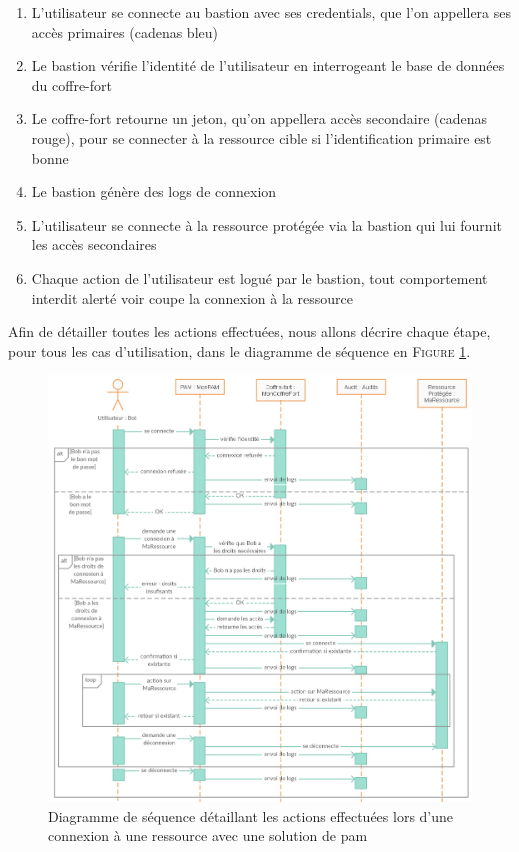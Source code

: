 \begin{enumerate}
	\item L'utilisateur se connecte au \gls{bastion} avec ses \glspl{credential}, que l'on appellera ses accès primaires (cadenas bleu)
	\item Le \gls{bastion} vérifie l'identité de l'utilisateur en interrogeant le base de données du coffre-fort
	\item Le coffre-fort retourne un jeton, qu'on appellera accès secondaire (cadenas rouge), pour se connecter à la ressource cible si l'identification primaire est bonne
	\item Le \gls{bastion} génère des logs de connexion
	\item L'utilisateur se connecte à la ressource protégée via la \gls{bastion} qui lui fournit les accès secondaires
	\item Chaque action de l'utilisateur est logué par le \gls{bastion}, tout comportement interdit alerté voir coupe la connexion à la ressource
\end{enumerate}

Afin de détailler toutes les actions effectuées, nous allons décrire chaque étape, pour tous les cas d'utilisation, dans le diagramme de séquence en \textsc{Figure} \ref{fig:diagseq_PAM}.

\begin{figure}[!ht]
    \center
    \includegraphics[width=1.2\textwidth]{./images/Sequence_PAM_use.png}
    \caption{Diagramme de séquence détaillant les actions effectuées lors d'une connexion à une ressource avec une solution de \gls{pam}}
    \label{fig:diagseq_PAM}
\end{figure}



